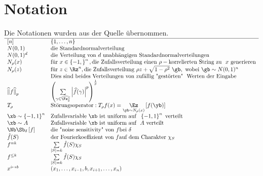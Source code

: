 \documentclass{article}
\begin{document}
	\section*{Notation}
	Die Notationen wurden aus der Quelle \cite{booleananalysis} \"ubernommen.\\
	\begin{math}
		\begin{array}[\textwidth]{l l }
			\hline	\left[n\right] & \left\lbrace 1, \dots , n \right\rbrace\\
			N(0,1) & \text{die Standardnormalverteilung} \\
			N(0,1)^d & \text{die Verteilung von} \ d \ \text{unabh\"angigen Standardnormalverteilungen} \\
			N_\rho(x) & \text{f\"ur} \ x \in \left\lbrace -1, \right\rbrace^n, \text{die Zufallsverteilung einen} \ \rho-\text{korrelierten String zu } \ x \ \text{generieren}    \\
			N_\rho(z) & \text{f\"ur} \ z \in \Rz^n, \text{die Zufallsverteilung} \ \rho z + \sqrt{1-\rho^2} \ \gb ,\ \text{wobei} \ \gb \sim N(0,1)^n \\		
				& \text{Dies sind beides Verteilungen von zuf\"allig "gest\"orten" \ Werten der Eingabe} \\
			{{ \widehat{\lVert} f \widehat{\rVert} }_p} & \left( \sum\limits_{\gamma \in \widehat{\Fz_2^n}} \left|  \widehat{f} (\gamma )\right|^p \right)^{\frac{1}{p}}\\
			T_\rho & \text{St\"orungsoperator}: T_\rho f(x)=\underset{\yb \sim N_\rho(x)}{\Ez}\left[f(\yb)\right]\\
			\xb \sim \left\lbrace -1,1 \right\rbrace^n  & \text{Zufallsvariable} \ \xb \ \text{ist uniform auf } \ \left\lbrace-1,1 \right\rbrace^n \ \text{verteilt}\\
			\xb \sim A  & \text{Zufallsvariable} \ \xb \ \text{ist uniform auf } \ A \ \text{verteilt}\\
			\Nb\Sb_\delta \left[f \right] & \text{die "noise sensitivity" von} \  f \text{bei} \ \delta\\
			\hat{f}(S) & \text{der Fourierkoeffizient von} \ f \text{auf dem Charakter} \ \chi_S\\
			f^{=k} & \sum\limits_{\left|S\right|=k} \hat{f}(S)\chi_S \\
			f^{\leq k} & \sum\limits_{\left|S\right|=k} \hat{f}(S)\chi_S \\
			x^{i \mapsto b} & (x_1, \dots , x_{i-1},b,x_{i+1}, \dots ,x_n)\\

\end{array}
\end{math}
\end{document}

